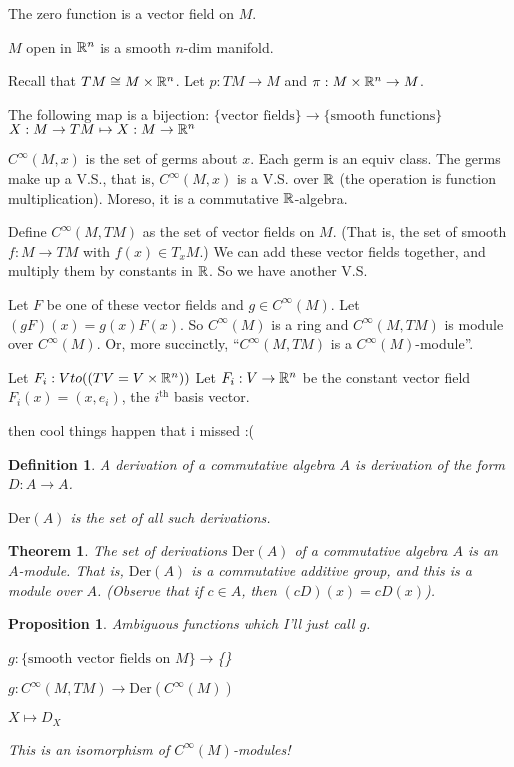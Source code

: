 \documentclass[11pt]{amsbook}
\theoremstyle{mystyle} \newtheorem{thrm}[thm]{Theorem}
\theoremstyle{mystyle} \newtheorem{defi}[thm]{Definition}
\theoremstyle{mystyle} \newtheorem{coro}[thm]{Corollary}
\theoremstyle{mystyle} \newtheorem{propo}[thm]{Proposition}
\theoremstyle{mystyle} \newtheorem{lemm}[thm]{Lemma}
\numberwithin{thm}{section}
\newcommand{\x}{\times}
\newcommand{\Der}{\text{Der}}
\newcommand{\de}{\emph}
\begin{document}

\begin{example}
	The zero function is a vector field on $M$.
\end{example}
\begin{example}
	$M$ open in ${\mathbb R}^n$ is a smooth $n$-dim manifold.

	Recall that $TM \mathrel{\cong}   M \times {\mathbb R}^n$.  Let $p:TM \to M$ and $\pi:M \times {\mathbb R}^n \to M$.

	The following map is a bijection:
	$\{\text{vector fields}\} \to \{\text{smooth functions}\}$
	$        X: M \to TM      \mapsto     X: M \to {\mathbb R}^n$
\end{example}
\begin{example}
	$C^\infty(M,x)$ is the set of germs about $x$.
	Each germ is an equiv class.
	The germs make up a V.S., that is, $C^\infty(M,x)$ is a V.S. over ${\mathbb R}$ (the operation is function multiplication).  Moreso, it is a commutative ${\mathbb R}$-algebra.

	Define $C^\infty(M, TM)$ as the set of vector fields on $M$.  (That is, the set of smooth $f: M \to TM$ with $f(x) \in T_xM$.)  We can add these vector fields together, and multiply them by constants in ${\mathbb R}$.  So we have another V.S.

	Let $F$ be one of these vector fields and $g \in C^\infty(M)$.
	Let $(gF)(x) = g(x)F(x)$.
	So $C^\infty(M)$ is a ring and $C^\infty(M, TM)$ is module over $C^\infty(M)$.  Or, more succinctly, ``$C^\infty(M, TM)$ is a $C^\infty(M)$-module''.

	Let $F_i : V to ((TV = V \x \R^n))$
	Let $F_i : V \to {\mathbb R}^n$ be the constant vector field $F_i(x) = (x,e_i)$, the $i^\text{th}$ basis vector.

	then cool things happen that i missed :(
\end{example}
\begin{defi}
	A \de{derivation} of a commutative algebra $A$ is derivation of the form $D: A \to A$.

	$\Der(A)$ is the set of all such derivations.
\end{defi}
\begin{thrm}
	The set of derivations $\Der(A)$ of a commutative algebra $A$ is an $A$-module.  That is, $\Der(A)$ is a commutative additive group, and this is a module over $A$.  (Observe that if $c \in A$, then $(cD)(x) = cD(x)$).
\end{thrm}

\begin{propo}
	Ambiguous functions which I'll just call $g$.

	$g : \{\text{smooth vector fields on $M$}\} \to $\{\}

	$g : C^\infty(M,TM) \to \Der(C^\infty(M))$

	$X \mapsto D_X$

	This is an isomorphism of $C^\infty(M)$-modules!
\end{propo}
\end{document}

